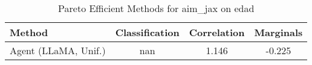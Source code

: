\begin{table}[t!]
    \centering
    \caption{Pareto Efficient Methods for aim_jax on edad}
    \label{tab:pareto_efficient_methods_aim_jax_edad}
    \begin{tabular}{lccc}
    \toprule
    Method & Classification & Correlation & Marginals \\
    \midrule
    Agent (LLaMA, Unif.) & nan & \cellcolor{gold!30}1.146 & \cellcolor{gold!30}-0.225 \\
    \bottomrule
    \end{tabular}
\end{table}
